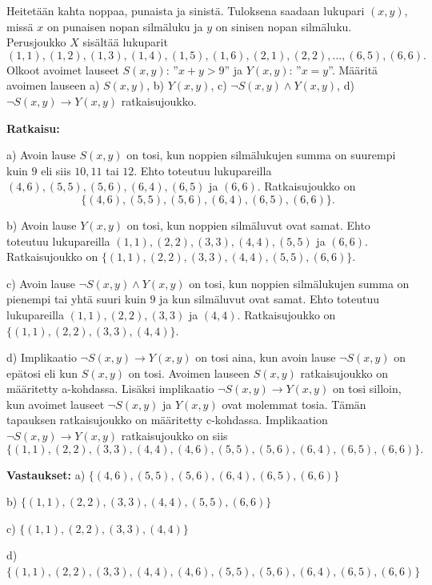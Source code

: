 \begin{esimerkki}
Heitetään kahta noppaa, punaista ja sinistä. Tuloksena saadaan lukupari $(x, y)$, missä $x$ on punaisen nopan silmäluku ja $y$ on sinisen nopan silmäluku. Perusjoukko $X$ sisältää lukuparit
\[
(1, 1), (1, 2), (1, 3), (1, 4), (1, 5), (1, 6), (2, 1), (2, 2),\ldots , (6, 5), (6, 6).
\]
Olkoot avoimet lauseet $S(x, y)$: ''$x + y > 9$'' ja $Y(x, y)$: ''$x = y$''. Määritä avoimen lauseen a) $S(x, y)$, b) $Y(x, y)$, c) $\lnot S(x, y) \land Y(x, y)$, d) $\lnot S(x, y) \to Y(x, y)$ ratkaisujoukko.


{\bf Ratkaisu:}

a) Avoin lause $S(x, y)$ on tosi, kun noppien silmälukujen summa on suurempi kuin $9$ eli siis $10, 11$ tai $12$. Ehto toteutuu lukupareilla $(4, 6), (5, 5), (5, 6), (6, 4), (6, 5)$ ja $(6, 6)$. Ratkaisujoukko on
\[
\{(4, 6), (5, 5), (5, 6), (6, 4), (6, 5), (6, 6)\}.
\]

b) Avoin lause $Y(x, y)$ on tosi, kun noppien silmäluvut ovat samat. Ehto toteutuu lukupareilla $(1, 1), (2, 2), (3, 3), (4, 4), (5, 5)$ ja $(6, 6)$. Ratkaisujoukko on $\{(1, 1), (2, 2), (3, 3), (4, 4), (5, 5), (6, 6)\}$.

c) Avoin lause $\lnot S(x, y) \land Y(x, y)$ on tosi, kun noppien silmälukujen summa on pienempi tai yhtä suuri kuin $9$ ja kun silmäluvut ovat samat. Ehto toteutuu lukupareilla $(1, 1), (2, 2), (3, 3)$ ja $(4, 4)$. Ratkaisujoukko on $\{(1, 1), (2, 2), (3, 3), (4, 4)\}$.


d) Implikaatio $\lnot S(x, y) \to Y(x, y)$ on tosi aina, kun avoin lause $\lnot S(x, y)$ on epätosi eli kun $S(x, y)$ on tosi. Avoimen lauseen $S(x, y)$ ratkaisujoukko on määritetty a-kohdassa. Lisäksi implikaatio $\lnot S(x, y) \to Y(x, y)$ on tosi silloin, kun avoimet lauseet $\lnot S(x, y)$ ja $Y(x, y)$ ovat molemmat tosia. Tämän tapauksen ratkaisujoukko on määritetty c-kohdassa. Implikaation $\lnot S(x, y) \to Y(x, y)$ ratkaisujoukko on siis
\[
\{(1, 1), (2, 2), (3, 3), (4, 4), (4, 6), (5, 5), (5, 6), (6, 4), (6, 5), (6, 6)\}.
\]

{\bf Vastaukset:} a) $\{(4, 6), (5, 5), (5, 6), (6, 4), (6, 5), (6, 6)\}$

b) $\{(1, 1), (2, 2), (3, 3), (4, 4), (5, 5), (6, 6)\}$

c) $\{(1, 1), (2, 2), (3, 3), (4, 4)\}$

d) $\{(1, 1), (2, 2), (3, 3), (4, 4), (4, 6), (5, 5), (5, 6), (6, 4), (6, 5), (6, 6)\}$
\end{esimerkki}

